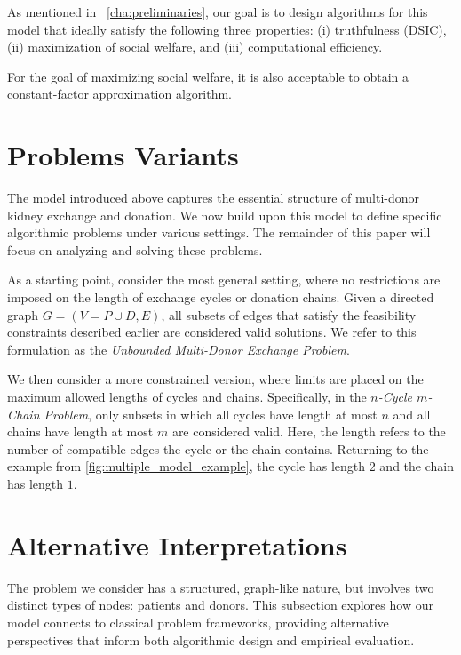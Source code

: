 As mentioned in ~\autoref{cha:preliminaries}, our goal is to design algorithms for this model that ideally satisfy the following three properties:  
(i) truthfulness (DSIC),  
(ii) maximization of social welfare, and  
(iii) computational efficiency.

For the goal of maximizing social welfare, it is also acceptable to obtain a constant-factor approximation algorithm.

\section{Problems Variants}

The model introduced above captures the essential structure of multi-donor kidney exchange and donation. We now build upon this model to define specific algorithmic problems under various settings. The remainder of this paper will focus on analyzing and solving these problems.

As a starting point, consider the most general setting, where no restrictions are imposed on the length of exchange cycles or donation chains. Given a directed graph $G = (V = P \cup D, E)$, all subsets of edges that satisfy the feasibility constraints described earlier are considered valid solutions. We refer to this formulation as the \textit{Unbounded Multi-Donor Exchange Problem}.

We then consider a more constrained version, where limits are placed on the maximum allowed lengths of cycles and chains. Specifically, in the \textit{$n$-Cycle $m$-Chain Problem}, only subsets in which all cycles have length at most $n$ and all chains have length at most $m$ are considered valid. Here, the length refers to the number of compatible edges the cycle or the chain contains. Returning to the example from \autoref{fig:multiple_model_example}, the cycle has length $2$ and the chain has length $1$.



\section{Alternative Interpretations}

The problem we consider has a structured, graph-like nature, but involves two distinct types of nodes: patients and donors. This subsection explores how our model connects to classical problem frameworks, providing alternative perspectives that inform both algorithmic design and empirical evaluation.


